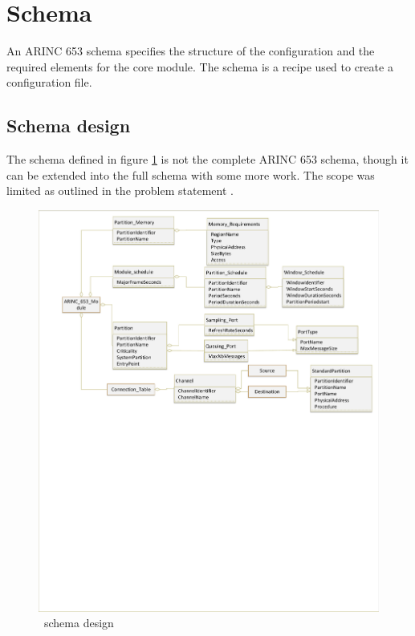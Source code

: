\section{Schema}
\label{sec:design_schema}
An ARINC 653 schema specifies the structure
of the configuration and the required elements
for the core module.
The schema is a recipe used to create a configuration file.


\subsection{Schema design}
\label{design:schema_design}
The schema defined in figure \ref{fig:open653schema} is not the complete
ARINC 653 schema, though it can be extended
into the full schema with some more work.
The scope was limited as outlined in the
problem statement .

\begin{figure}[H]	\includegraphics[clip=true,trim=0cm 20cm 0cm 0cm,width=\linewidth,keepaspectratio]{figures/open653schema.pdf}
	\caption{\OSname\ schema design}
	\label{fig:open653schema}
\end{figure}

